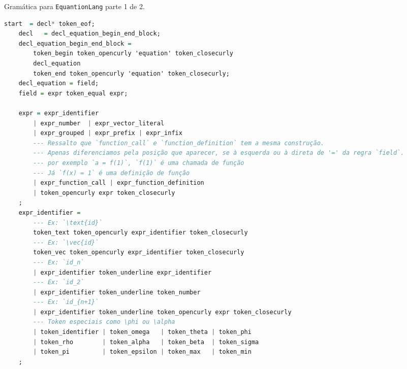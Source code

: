 \begin{codigo}[H]
        \caption{\small Gramática para \texttt{EquantionLang} parte 1 de 2.}
        \label{grammar-ast-pt1}
        
\begin{lstlisting}[language=haskell, basicstyle=\ttfamily\footnotesize, numbers=none, inputencoding=utf8]
    start  = decl* token_eof;
    decl   = decl_equation_begin_end_block;
    decl_equation_begin_end_block =
        token_begin token_opencurly 'equation' token_closecurly
        decl_equation
        token_end token_opencurly 'equation' token_closecurly;
    decl_equation = field;
    field = expr token_equal expr;

    expr = expr_identifier
        | expr_number  | expr_vector_literal
        | expr_grouped | expr_prefix | expr_infix
        --- Ressalto que `function_call` e `function_definition` tem a mesma construção.
        --- Apenas diferenciamos pela posição que aparecer, se à esquerda ou à direta de '=' da regra `field`.
        --- por exemplo `a = f(1)`, `f(1)` é uma chamada de função
        --- Já `f(x) = 1` é uma definição de função
        | expr_function_call | expr_function_definition
        | token_opencurly expr token_closecurly
    ;
    expr_identifier =
        --- Ex: `\text{id}`
        token_text token_opencurly expr_identifier token_closecurly
        --- Ex: `\vec{id}`
        token_vec token_opencurly expr_identifier token_closecurly
        --- Ex: `id_n`
        | expr_identifier token_underline expr_identifier
        --- Ex: `id_2`
        | expr_identifier token_underline token_number
        --- Ex: `id_{n+1}`
        | expr_identifier token_underline token_opencurly expr token_closecurly
        --- Token especiais como \phi ou \alpha
        | token_identifier | token_omega   | token_theta | token_phi
        | token_rho        | token_alpha   | token_beta  | token_sigma
        | token_pi         | token_epsilon | token_max   | token_min
    ;

\end{lstlisting}
\end{codigo}

